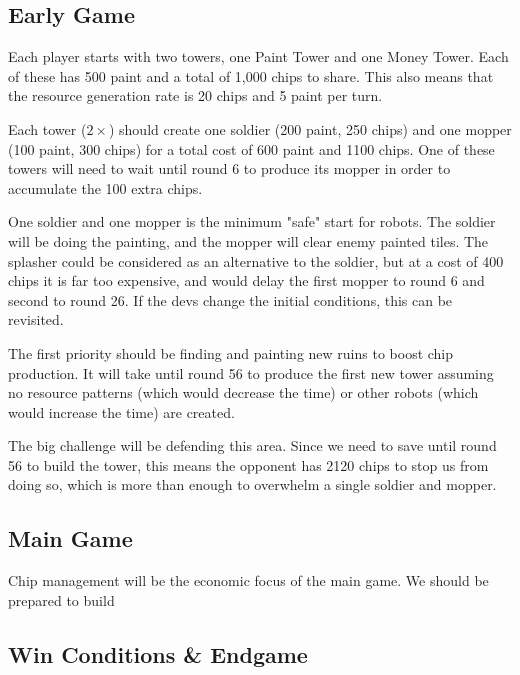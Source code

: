 \documentclass{article}
\begin{document}
  \subsection*{Early Game}
  Each player starts with two towers, one Paint Tower and one Money Tower. Each of these has 500 paint and a total of 1,000 chips to share. This also means that the resource generation rate is 20 chips and 5 paint per turn.

  \medskip

  Each tower ($2 \times$) should create one soldier (200 paint, 250 chips) and one mopper (100 paint, 300 chips) for a total cost of 600 paint and 1100 chips. One of these towers will need to wait until round 6 to produce its mopper in order to accumulate the 100 extra chips.

  \medskip

  One soldier and one mopper is the minimum "safe" start for robots. The soldier will be doing the painting, and the mopper will clear enemy painted tiles. The splasher could be considered as an alternative to the soldier, but at a cost of 400 chips it is far too expensive, and would delay the first mopper to round 6 and second to round 26. If the devs change the initial conditions, this can be revisited.

  \medskip

  The first priority should be finding and painting new ruins to boost chip production. It will take until round 56 to produce the first new tower assuming no resource patterns (which would decrease the time) or other robots (which would increase the time) are created.

  \medskip

  The big challenge will be defending this area. Since we need to save until round 56 to build the tower, this means the opponent has 2120 chips to stop us from doing so, which is more than enough to overwhelm a single soldier and mopper.

  \subsection*{Main Game}

  Chip management will be the economic focus of the main game. We should be prepared to build 

  \subsection*{Win Conditions \& Endgame}
\end{document}
